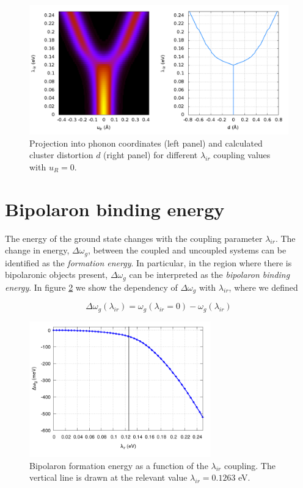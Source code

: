 \begin{figure}[ht!]
  \centering
  \includegraphics[width=1.0\textwidth]{images/uir-vs-coupl-d.png}
  \caption{Projection into phonon coordinates (left panel) and calculated cluster distortion $d$ (right panel) for different $\lambda_{ir}$ coupling values with $u_R=0$.}
  \label{fig:uir-vs-coupl}
\end{figure}

\section{Bipolaron binding energy}
\label{sec:grd-binding-energy}

The energy of the ground state changes with the coupling parameter $\lambda_{ir}$.
The change in energy, $\Delta\omega_{g}$, between the coupled and uncoupled systems can be identified as the \textit{formation energy}.
In particular, in the region where there is bipolaronic objects present, $\Delta\omega_{g}$ can be interpreted as the \textit{bipolaron binding energy}. 
In figure \ref{fig:bip-energy} we show the dependency of $\Delta\omega_{g}$ with $\lambda_{ir}$, where we defined

\begin{equation}
  \label{eq:pol-energy}
  \Delta\omega_{g}(\lambda_{ir}) = \omega_{g}(\lambda_{ir} = 0) - \omega_{g}(\lambda_{ir})
\end{equation}

\begin{figure}[ht!]
  \centering
  \includegraphics[width=0.7\textwidth]{images/polaron-formation.png}
  \caption{Bipolaron formation energy as a function of the $\lambda_{ir}$ coupling. The vertical line is drawn at the relevant value $\lambda_{ir}=0.1263$ eV.}
  \label{fig:bip-energy}
\end{figure}

